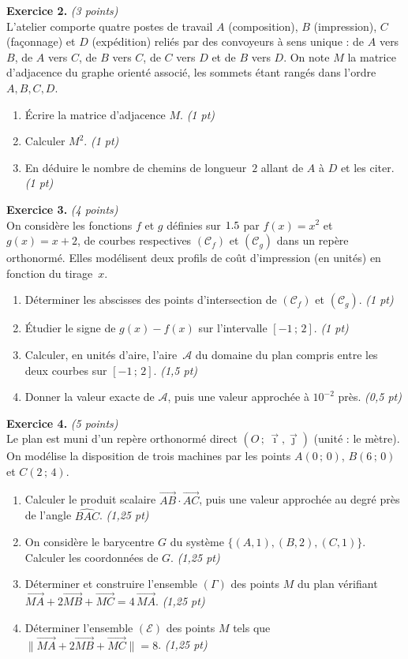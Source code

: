 \smallskip
\noindent\textbf{Exercice 2.} \hfill\textit{(3 points)}\\
L'atelier comporte quatre postes de travail $A$ (composition), $B$ (impression),
$C$ (façonnage) et $D$ (expédition) reliés par des convoyeurs à sens unique :
de $A$ vers $B$, de $A$ vers $C$, de $B$ vers $C$, de $C$ vers $D$ et de $B$ vers $D$.
On note $M$ la matrice d'adjacence du graphe orienté associé, les sommets étant rangés
dans l'ordre $A,B,C,D$.
\begin{enumerate}[label=\arabic*)]
\item Écrire la matrice d'adjacence $M$. \hfill\textit{(1 pt)}
\item Calculer $M^2$. \hfill\textit{(1 pt)}
\item En déduire le nombre de chemins de longueur~$2$ allant de $A$ à $D$ et les citer. \hfill\textit{(1 pt)}
\end{enumerate}

\smallskip
\noindent\textbf{Exercice 3.} \hfill\textit{(4 points)}\\
On considère les fonctions $f$ et $g$ définies sur $1.5$ par $f(x)=x^2$ et $g(x)=x+2$, de
courbes respectives $(\mathcal{C}_f)$ et $(\mathcal{C}_g)$ dans un repère orthonormé.
Elles modélisent deux profils de coût d'impression (en unités) en fonction du tirage~$x$.
\begin{enumerate}[label=\arabic*)]
\item Déterminer les abscisses des points d'intersection de $(\mathcal{C}_f)$ et
$(\mathcal{C}_g)$. \hfill\textit{(1 pt)}
\item Étudier le signe de $g(x)-f(x)$ sur l'intervalle $[-1\,;\,2]$. \hfill\textit{(1 pt)}
\item Calculer, en unités d'aire, l'aire~$\mathcal{A}$ du domaine du plan compris entre
les deux courbes sur $[-1\,;\,2]$. \hfill\textit{(1,5 pt)}
\item Donner la valeur exacte de $\mathcal{A}$, puis une valeur approchée à $10^{-2}$ près. \hfill\textit{(0,5 pt)}
\end{enumerate}

\smallskip
\noindent\textbf{Exercice 4.} \hfill\textit{(5 points)}\\
Le plan est muni d'un repère orthonormé direct $(O\,;\,\vec\imath,\vec\jmath)$ (unité :
le mètre). On modélise la disposition de trois machines par les points $A(0\,;\,0)$,
$B(6\,;\,0)$ et $C(2\,;\,4)$.
\begin{enumerate}[label=\arabic*)]
\item Calculer le produit scalaire $\vec{AB}\cdot\vec{AC}$, puis une valeur approchée au
degré près de l'angle $\widehat{BAC}$. \hfill\textit{(1,25 pt)}
\item On considère le barycentre $G$ du système $\{(A,1),(B,2),(C,1)\}$. Calculer les
coordonnées de $G$. \hfill\textit{(1,25 pt)}
\item Déterminer et construire l'ensemble $(\Gamma)$ des points $M$ du plan vérifiant
$\vec{MA}+2\vec{MB}+\vec{MC}=4\,\vec{MA}$. \hfill\textit{(1,25 pt)}
\item Déterminer l'ensemble $(\mathcal{E})$ des points $M$ tels que
$\big\|\vec{MA}+2\vec{MB}+\vec{MC}\big\|=8$. \hfill\textit{(1,25 pt)}
\end{enumerate}

